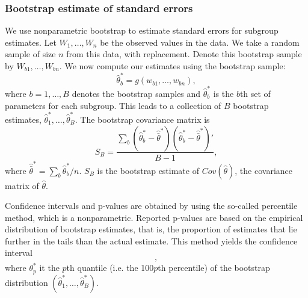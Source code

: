 \documentclass{article}
\begin{document}
\subsubsection*{Bootstrap estimate of standard errors}

We use nonparametric bootstrap to estimate standard errors for subgroup estimates. Let $W_1,\ldots, W_n$ be the observed values in the data. We take a random sample of size $n$ from this data, with replacement. Denote this bootstrap sample by $W_{b1},\ldots, W_{bn}$. We now compute our estimates using the bootstrap sample:
\begin{equation}
  \hat \theta_b^* = g(w_{b1},\ldots, w_{bn}),
\end{equation}
where $b=1,\ldots,B$ denotes the bootstrap samples and $\hat\theta_b^*$ is the $b$th set of parameters for each subgroup.
This leads to a collection of $B$ bootstrap estimates, $\hat\theta_{1}^*,\ldots,\hat\theta_{B}^*$. The bootstrap covariance matrix is
\begin{equation}
S_B = \frac{\sum_b (\hat\theta_b^* - \hat{\bar\theta}^*) (\hat\theta_b^* - \hat{\bar\theta}^*)'}{B-1},
\end{equation}
where $\hat{\bar\theta}^* = \sum_b \hat\theta_b^*/n$. $S_B$ is the bootstrap estimate of $Cov(\hat\theta)$, the covariance matrix of $\hat\theta$.

Confidence intervals and p-values are obtained by using the so-called percentile method, which is a nonparametric.
Reported p-values are based on the empirical distribution of bootstrap estimates, that is, the proportion of estimates that lie further in the tails than the actual estimate. This method yields the confidence interval
\begin{equation}
[\theta^*_{\alpha/2}, \theta^*_{1-\alpha/2}],
\end{equation}
where $\theta^*_p$ it the $p$th quantile (i.e. the 100$p$th percentile) of the bootstrap distribution $(\hat\theta_{1}^*,\ldots,\hat\theta_{B}^*)$.
\end{document}
